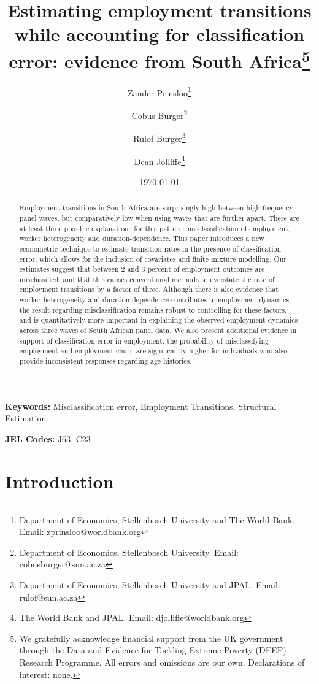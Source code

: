 \documentclass[letterpaper,12pt,final,dvipsnames]{article}
\title{Estimating employment transitions while accounting for classification error: evidence from South Africa\thanks{We gratefully acknowledge financial support from the UK government through the Data and Evidence for Tackling Extreme Poverty (DEEP) Research Programme. All errors and omissions are our own. Declarations of interest: none.}}
\author{Zander Prinsloo\thanks{Department of Economics, Stellenbosch University and The World Bank. Email: zprinsloo@worldbank.org } \and Cobus Burger\thanks{Department of Economics, Stellenbosch University. Email: cobusburger@sun.ac.za}  \and Rulof Burger\thanks{Department of Economics, Stellenbosch University and JPAL. Email: rulof@sun.ac.za} \and Dean Jolliffe\thanks{The World Bank and JPAL. Email: djolliffe@worldbank.org}}
\date{\today}
\begin{document}
\maketitle


\begin{abstract}
Employment transitions in South Africa are surprisingly high between high-frequency panel waves, but comparatively low when using waves that are further apart. There are at least three possible explanations for this pattern: misclassification of employment, worker heterogeneity and duration-dependence. This paper introduces a new econometric technique to estimate transition rates in the presence of classification error, which allows for the inclusion of covariates and finite mixture modelling. Our estimates suggest that between 2 and 3 percent of employment outcomes are misclassified, and that this causes conventional methods to overstate the rate of employment transitions by a factor of three. Although there is also evidence that worker heterogeneity and duration-dependence contributes to employment dynamics, the result regarding misclassification remains robust to controlling for these factors, and is quantitatively more important in explaining the observed employment dynamics across three waves of South African panel data. We also present additional evidence in support of classification error in employment: the probability of misclassifying employment and employment churn are significantly higher for individuals who also provide inconsistent responses regarding age histories. 


\end{abstract}

\medskip
\medskip

\noindent \textbf{Keywords:} Misclassification error, Employment Transitions, Structural Estimation

\noindent \textbf{JEL Codes:} J63, C23   

\pagebreak

\section{Introduction}
\end{document}
